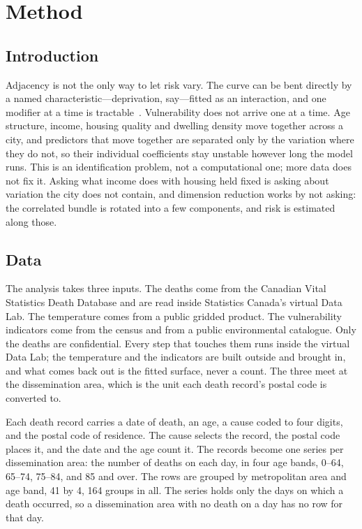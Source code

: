 \chapter{Method}\label{chapter:method}

\section{Introduction}

Adjacency is not the only way to let risk vary. The curve can be bent directly by a named characteristic---deprivation, say---fitted as an interaction, and one modifier at a time is tractable~\citep{rutten2026effectmod}. Vulnerability does not arrive one at a time. Age structure, income, housing quality and dwelling density move together across a city, and predictors that move together are separated only by the variation where they do not, so their individual coefficients stay unstable however long the model runs. This is an identification problem, not a computational one; more data does not fix it. Asking what income does with housing held fixed is asking about variation the city does not contain, and dimension reduction works by not asking: the correlated bundle is rotated into a few components, and risk is estimated along those.

\section{Data}

The analysis takes three inputs. The deaths come from the Canadian Vital
Statistics Death Database and are read inside Statistics Canada's virtual
Data Lab. The temperature comes from a public gridded product. The
vulnerability indicators come from the census and from a public
environmental catalogue. Only the deaths are confidential. Every step that
touches them runs inside the virtual Data Lab; the temperature and the
indicators are built outside and brought in, and what comes back out is the
fitted surface, never a count. The three meet at the dissemination area,
which is the unit each death record's postal code is converted to.

Each death record carries a date of death, an age, a cause coded to four
digits, and the postal code of residence. The cause selects the record, the
postal code places it, and the date and the age count it. The records
become one series per dissemination area: the number of deaths on each day,
in four age bands, 0--64, 65--74, 75--84, and 85 and over. The rows are
grouped by metropolitan area and age band, 41 by 4, 164 groups in all. The
series holds only the days on which a death occurred, so a dissemination
area with no death on a day has no row for that day.

